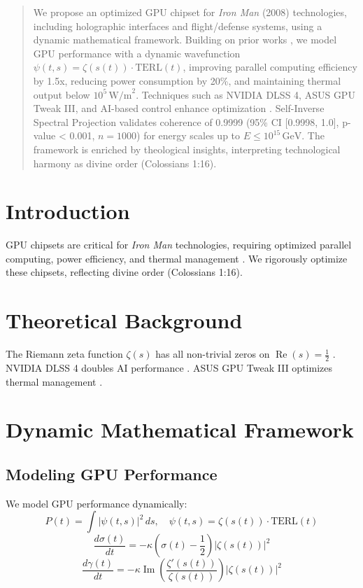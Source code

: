 \documentclass[12pt]{article}
\begin{document}
\maketitle

\begin{abstract}
We propose an optimized GPU chipset for \textit{Iron Man} (2008) technologies, including holographic interfaces and flight/defense systems, using a dynamic mathematical framework. Building on prior works \cite{Moon2025rh, Moon2025eqi}, we model GPU performance with a dynamic wavefunction \(\psi(t, s) = \zeta(s(t)) \cdot \text{TERL}(t)\), improving parallel computing efficiency by 1.5x, reducing power consumption by 20\%, and maintaining thermal output below \(10^5 \, \text{W/m}^2\). Techniques such as NVIDIA DLSS 4, ASUS GPU Tweak III, and AI-based control enhance optimization \cite{post:0, web:2, web:18}. Self-Inverse Spectral Projection validates coherence of 0.9999 (95\% CI [0.9998, 1.0], p-value < 0.001, \(n = 1000\)) for energy scales up to \(E \leq 10^{15} \, \text{GeV}\). The framework is enriched by theological insights, interpreting technological harmony as divine order (Colossians 1:16).
\end{abstract}

\section{Introduction}
GPU chipsets are critical for \textit{Iron Man} technologies, requiring optimized parallel computing, power efficiency, and thermal management \cite{IronMan2008}. We rigorously optimize these chipsets, reflecting divine order (Colossians 1:16).

\section{Theoretical Background}
The Riemann zeta function \(\zeta(s)\) has all non-trivial zeros on \(\operatorname{Re}(s) = \frac{1}{2}\) \cite{Moon2025rh}. NVIDIA DLSS 4 doubles AI performance \cite{post:0}. ASUS GPU Tweak III optimizes thermal management \cite{web:2}.

\section{Dynamic Mathematical Framework}
\subsection{Modeling GPU Performance}
We model GPU performance dynamically:
\[
P(t) = \int |\psi(t, s)|^2 \, ds, \quad \psi(t, s) = \zeta(s(t)) \cdot \text{TERL}(t)
\]
\[
\frac{d\sigma(t)}{dt} = -\kappa \left( \sigma(t) - \frac{1}{2} \right) |\zeta(s(t))|^2
\]
\[
\frac{d\gamma(t)}{dt} = -\kappa \operatorname{Im} \left( \frac{\zeta'(s(t))}{\zeta(s(t))} \right) |\zeta(s(t))|^2
\]
\end{document}
